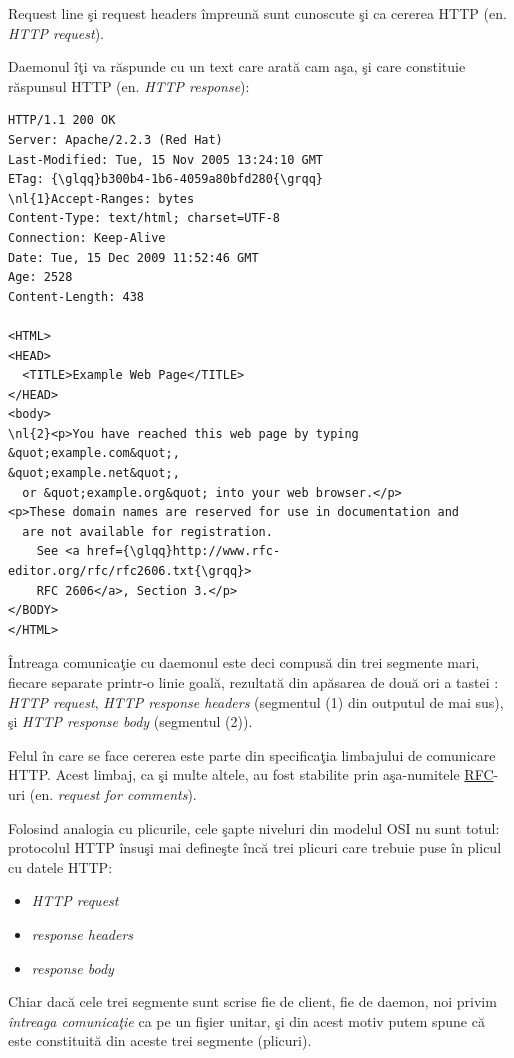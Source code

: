 Request line şi request headers împreună sunt cunoscute şi ca cererea HTTP (en.
\textsl{HTTP request}).
	
Daemonul îţi va răspunde cu un text care arată cam aşa, şi care constituie răspunsul
HTTP (en. \textsl{HTTP response}):
\begin{Verbatim}[commandchars=\\\{\}]
HTTP/1.1 200 OK
Server: Apache/2.2.3 (Red Hat)
Last-Modified: Tue, 15 Nov 2005 13:24:10 GMT
ETag: {\glqq}b300b4-1b6-4059a80bfd280{\grqq}            
\nl{1}Accept-Ranges: bytes                        
Content-Type: text/html; charset=UTF-8      
Connection: Keep-Alive                      
Date: Tue, 15 Dec 2009 11:52:46 GMT         
Age: 2528                                   
Content-Length: 438

<HTML>
<HEAD>
  <TITLE>Example Web Page</TITLE>
</HEAD>                          
<body>                           
\nl{2}<p>You have reached this web page by typing &quot;example.com&quot;,
&quot;example.net&quot;,                                            
  or &quot;example.org&quot; into your web browser.</p>             
<p>These domain names are reserved for use in documentation and
  are not available for registration.
	See <a href={\glqq}http://www.rfc-editor.org/rfc/rfc2606.txt{\grqq}>
	RFC 2606</a>, Section 3.</p>        
</BODY>                                                                           
</HTML>
\end{Verbatim}
Întreaga comunicaţie cu daemonul este deci compusă din trei segmente mari, fiecare separate
printr-o linie goală, rezultată din apăsarea de două ori a tastei :
\textsl{HTTP request}, \textsl{HTTP response headers} (segmentul (1) din outputul de mai sus),
şi \textsl{HTTP response body} (segmentul (2)).

Felul în care se face cererea este parte din specificaţia
limbajului de comunicare HTTP. Acest limbaj, ca şi multe altele, au fost stabilite
prin aşa-numitele \href{http://en.wikipedia.org/wiki/Request_for_Comments}{RFC}-uri
(en. \textsl{request for comments}).

Folosind analogia cu plicurile, cele şapte niveluri din modelul OSI nu sunt totul:
protocolul HTTP însuşi mai defineşte încă trei plicuri care trebuie puse în
{\glqq}plicul{\grqq} cu datele HTTP:
\begin{itemize}
\item \textsl{HTTP request}
\item \textsl{response headers}
\item \textsl{response body}
\end{itemize}
Chiar dacă cele trei {\glqq}segmente{\grqq} sunt scrise fie de client, fie de daemon,
noi privim \textit{întreaga comunicaţie} ca pe un fişier unitar, şi din acest motiv
putem spune că este constituită din aceste trei segmente ({\glqq}plicuri{\grqq}).

